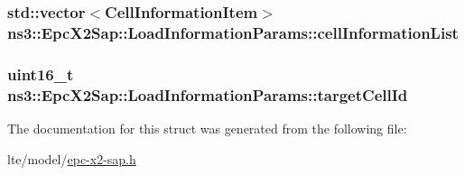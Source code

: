 \subsubsection[{\texorpdfstring{cell\+Information\+List}{cellInformationList}}]{\setlength{\rightskip}{0pt plus 5cm}std\+::vector$<${\bf Cell\+Information\+Item}$>$ ns3\+::\+Epc\+X2\+Sap\+::\+Load\+Information\+Params\+::cell\+Information\+List}\hypertarget{structns3_1_1EpcX2Sap_1_1LoadInformationParams_a7af487b133b6bc27fec89b9af25c0e11}{}\label{structns3_1_1EpcX2Sap_1_1LoadInformationParams_a7af487b133b6bc27fec89b9af25c0e11}
\subsubsection[{\texorpdfstring{target\+Cell\+Id}{targetCellId}}]{\setlength{\rightskip}{0pt plus 5cm}uint16\+\_\+t ns3\+::\+Epc\+X2\+Sap\+::\+Load\+Information\+Params\+::target\+Cell\+Id}\hypertarget{structns3_1_1EpcX2Sap_1_1LoadInformationParams_ae27357b920fef98c007d4a6a2fd5ee65}{}\label{structns3_1_1EpcX2Sap_1_1LoadInformationParams_ae27357b920fef98c007d4a6a2fd5ee65}


The documentation for this struct was generated from the following file\+:\begin{DoxyCompactItemize}
\item 
lte/model/\hyperlink{epc-x2-sap_8h}{epc-\/x2-\/sap.\+h}\end{DoxyCompactItemize}
